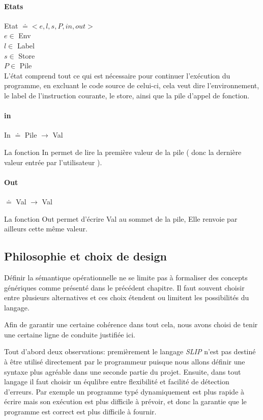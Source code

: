 \paragraph{Etats} Etat $\doteq <e,l,s,P,in,out>$\\

$e \in $ Env   \\
$l \in $ Label \\
$s \in $ Store \\
$P \in $ Pile  \\
L'état comprend tout ce qui est nécessaire pour continuer l'exécution du programme, en excluant le
code source de celui-ci, cela veut dire l'environnement, le label de l'instruction courante, le store,
ainsi que la pile d'appel de fonction. 

\paragraph{in} In $\doteq$ Pile $\rightarrow$ Val

La fonction In permet de lire la première valeur de la pile ( donc la dernière valeur entrée par l'utilisateur ).

\paragraph{Out} $\doteq$ Val  $\rightarrow$ Val

La fonction Out permet d'écrire Val au sommet de la pile, Elle renvoie par ailleurs cette même valeur.

\subsection{Philosophie et choix de design}
	Définir la sémantique opérationnelle ne se limite pas à formaliser des concepts génériques
	comme présenté dans le précédent chapitre. Il faut souvent choisir entre plusieurs alternatives
	et ces choix étendent ou limitent les possibilités du langage.

	Afin de garantir une certaine cohérence dans tout cela, nous avons choisi de tenir une 
	certaine ligne de conduite justifiée ici.

	Tout d'abord deux observations: premièrement le langage \emph{SLIP} n'est pas destiné à 
	être utilisé directement par le programmeur puisque nous allons définir une syntaxe plus 
	agréable dans une seconde partie du projet. Ensuite, dans tout langage il faut choisir 
	un équlibre entre flexibilité et facilité de détection d'erreurs. Par exemple un programme
	typé dynamiquement est plus rapide à écrire mais son exécution est plus difficile à prévoir,
	et donc la garantie que le programme est correct est plus difficile à fournir.

